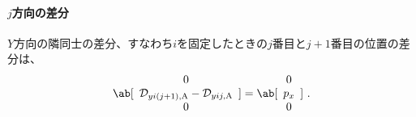 \paragraph*{$j$方向の差分}
$Y$方向の隣同士の差分、すなわち$i$を固定したときの$j$番目と$j+1$番目の位置の差分は、
\begin{align*}
  \ab[
  \begin{array}{c}
    0\\
    \mathcal D_{yi(j+1),\mathrm A}-\mathcal D_{yij,\mathrm A}\\
    0
  \end{array}
  ]
  = \ab[
    \begin{array}{c}
      0\\
      p_x\\
      0
    \end{array}
    ]\ .
\end{align*}


\clearpage
